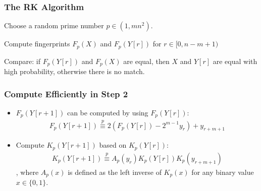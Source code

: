 \begin{frame}
	\frametitle{The RK Algorithm}
	\begin{description}
		\setlength\itemsep{1em}
		\item[(1)] Choose a random prime number $p \in (1, mn^2)$.
		\item[(2)] Compute fingerprints $F_p(X)$ and $F_p(Y[r])$ for 
			$r \in [0, n-m+1)$
		\item[(3)] Compare: if $F_p(Y[r])$ and $F_p(X)$ are equal,
			then $X$ and $Y[r]$ are equal with high probability, 
			otherwise there is no match.
	\end{description}
\end{frame}

\begin{frame}
	\frametitle{Compute Efficiently in Step 2}
	\begin{itemize}
		\item $F_p(Y[r+1])$ can be computed by using $F_p(Y[r])$:
			\begin{align}
			F_p(Y[r+1]) \overset{p}{\equiv} 2 (F_p(Y[r]) - 2^{m-1} y_r) + y_{r+m+1}
			\end{align}
		\item Compute $K_p(Y[r+1])$ based on $K_p(Y[r])$:
			\begin{align}
			K_p(Y[r+1]) \overset{p}{\equiv} A_p(y_r) K_p(Y[r]) K_p(y_{r+m+1})
			\end{align},
			where $A_p(x)$ is defined as the left inverse of $K_p(x)$ for any binary value $x \in \{0, 1\}$.
	\end{itemize}
\end{frame}


